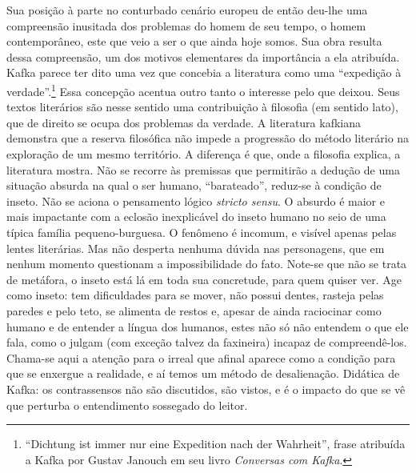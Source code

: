 Sua posição à parte no conturbado cenário europeu de então deu-lhe uma
compreensão inusitada dos problemas do homem de seu tempo, o homem
contemporâneo, este que veio a ser o que ainda hoje somos. Sua obra
resulta dessa compreensão, um dos motivos elementares da importância a
ela atribuída. Kafka parece ter dito uma vez que concebia a literatura
como uma “expedição à verdade”.\footnote{ “Dichtung ist immer nur eine
Expedition nach der Wahrheit”, frase atribuída a Kafka por Gustav
Janouch em seu livro \textit{Conversas com Kafka}.} Essa concepção
acentua outro tanto o interesse pelo que deixou. Seus textos literários
são nesse sentido uma contribuição à filosofia (em sentido lato), que
de direito se ocupa dos problemas da verdade. A literatura kafkiana
demonstra que a reserva filosófica não impede a progressão do método
literário na exploração de um mesmo território. A diferença é que, onde
a filosofia explica, a literatura mostra. Não se recorre às premissas
que permitirão a dedução de uma situação absurda na qual o ser humano,
“barateado”, reduz-se à condição de inseto. Não se aciona o
pensamento lógico \textit{stricto sensu}. O absurdo é maior e mais
impactante com a eclosão inexplicável do inseto humano no seio de uma
típica família pequeno-burguesa. O fenômeno é incomum, e visível
apenas pelas lentes literárias. Mas não desperta nenhuma dúvida nas
personagens, que em nenhum momento questionam a impossibilidade do
fato. Note-se que não se trata de metáfora, o inseto está lá em toda
sua concretude, para quem quiser ver. Age como inseto: tem dificuldades
para se mover, não possui dentes, rasteja pelas paredes e pelo teto,
se alimenta de restos e, apesar de ainda raciocinar como humano e de
entender a língua dos humanos, estes não só não entendem o que ele
fala, como o julgam (com exceção talvez da faxineira) incapaz de
compreendê-los. Chama-se aqui a atenção para o irreal que afinal
aparece como a condição para que se enxergue a realidade, e aí temos um
método de desalienação. Didática de Kafka: os contrassensos não são
discutidos, são vistos, e é o impacto do que se vê que perturba o
entendimento sossegado do leitor.

